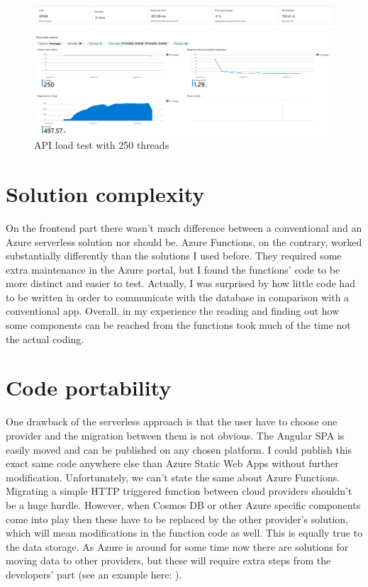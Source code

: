 \begin{figure}[!ht]
	\centering
	\includegraphics[width=150mm, keepaspectratio]{figures/loadtest/funcapp250-2.png}
	\caption{API load test with 250 threads} 
	\label{fig:APIlt}
\end{figure}

\section{Solution complexity}

On the frontend part there wasn't much difference between a conventional and an Azure serverless solution nor should be. Azure Functions, on the contrary, worked substantially differently than the solutions I used before. They required some extra maintenance in the Azure portal, but I found the functions' code to be more distinct and easier to test. Actually, I was surprised by how little code had to be written in order to communicate with the database in comparison with a conventional app. Overall, in my experience the reading and finding out how some components can be reached from the functions took much of the time not the actual coding.

\section{Code portability}

One drawback of the serverless approach is that the user have to choose one provider and the migration between them is not obvious. The Angular SPA is easily moved and can be published on any chosen platform. I could publish this exact same code anywhere else than Azure Static Web Apps without further modification. Unfortunately, we can't state the same about Azure Functions. Migrating a simple HTTP triggered function between cloud providers shouldn't be a huge hurdle. However, when Cosmos DB or other Azure specific components come into play then these have to be replaced by the other provider's solution, which will mean modifications in the function code as well. This is equally true to the data storage. As Azure is around for some time now there are solutions for moving data to other providers, but these will require extra steps from the developers' part (see an example here: \cite{MongoMoveData}).